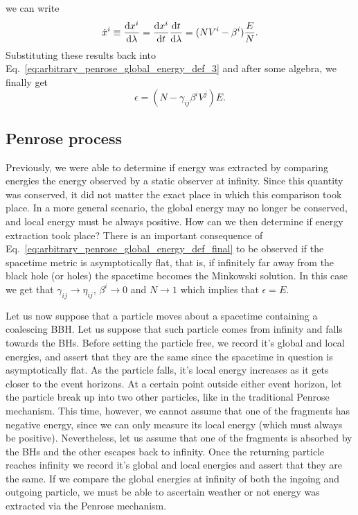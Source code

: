 %
we can write
%
\begin{equation}
  \dot{x}^i \equiv \frac{\mathrm{d} x^i}{\mathrm{d} \lambda} = \frac{\mathrm{d} x^i}{\mathrm{d} t} \frac{\mathrm{d} t}{\mathrm{d} \lambda} = (N V^i - \beta^i ) \frac{E}{N}.
  \label{eq:arbitrary_penrose_dx_dlambda_def}
\end{equation}
%
Substituting these results back into Eq.~\eqref{eq:arbitrary_penrose_global_energy_def_3} and after some algebra, we finally get
%
\begin{equation}
  \epsilon = \left( N - \gamma_{ij}\beta^i V^j \right) E.
  \label{eq:arbitrary_penrose_global_energy_def_final}
\end{equation}

\subsection{Penrose process}

Previously, we were able to determine if energy was extracted by comparing energies the energy observed by a static observer at infinity. Since this quantity was conserved, it did not matter the exact place in which this comparison took place. In a more general scenario, the global energy may no longer be conserved, and local energy must be always positive. How can we then determine if energy extraction took place? There is an important consequence of Eq.~\eqref{eq:arbitrary_penrose_global_energy_def_final} to be observed if the spacetime metric is asymptotically flat, that is, if infinitely far away from the black hole (or holes) the spacetime becomes the Minkowski solution. In this case we get that $\gamma_{ij} \rightarrow \eta_{ij}$, $\beta^i \rightarrow 0$ and $N \rightarrow 1$ which implies that $\epsilon = E$.

Let us now suppose that a particle moves about a spacetime containing a coalescing BBH. Let us suppose that such particle comes from infinity and falls towards the BHs. Before setting the particle free, we record it's global and local energies, and assert that they are the same since the spacetime in question is asymptotically flat. As the particle falls, it's local energy increases as it gets closer to the event horizons. At a certain point outside either event horizon, let the particle break up into two other particles, like in the traditional Penrose mechanism. This time, however, we cannot assume that one of the fragments has negative energy, since we can only measure its local energy (which must always be positive). Nevertheless, let us assume that one of the fragments is absorbed by the BHs and the other escapes back to infinity. Once the returning particle reaches infinity we record it's global and local energies and assert that they are the same. If we compare the global energies at infinity of both the ingoing and outgoing particle, we must be able to ascertain weather or not energy was extracted via the Penrose mechanism.

